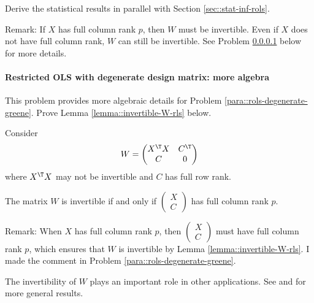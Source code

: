 Derive the statistical results in parallel with Section \ref{sec::stat-inf-rols}. 


Remark:
If $X$ has full column rank $p$, then $W$ must be invertible. Even if $X$ does not have full column rank, $W$ can still be invertible. See Problem \ref{para::rols-degenerate-condition} below for more details. 



\paragraph{Restricted OLS with degenerate design matrix: more algebra}
\label{para::rols-degenerate-condition}


This problem provides more algebraic details for Problem \ref{para::rols-degenerate-greene}. Prove Lemma \ref{lemma::invertible-W-rls} below.  


\begin{lemma}
\label{lemma::invertible-W-rls}
Consider 
$$
W = 
\begin{pmatrix}
X^{\T} X &  C^{\T} \\
C & 0 
\end{pmatrix}
$$
where $X^{\T} X$ may not be invertible and $C$ has full row rank. 

The matrix $W$ is invertible if and only if
$
\begin{pmatrix}
X\\
C
\end{pmatrix}
$
has full column rank $p$. 
\end{lemma}



Remark: When $X$ has full column rank $p$, then 
$
\begin{pmatrix}
X\\
C
\end{pmatrix}
$
must have full column rank $p$, which ensures that $W$ is invertible by Lemma \ref{lemma::invertible-W-rls}. I made the comment in Problem \ref{para::rols-degenerate-greene}. 

The invertibility of $W$ plays an important role in other applications. See \citet{benzi2005numerical} and \citet{bai2013nonsingularity} for more general results. 
 
 
